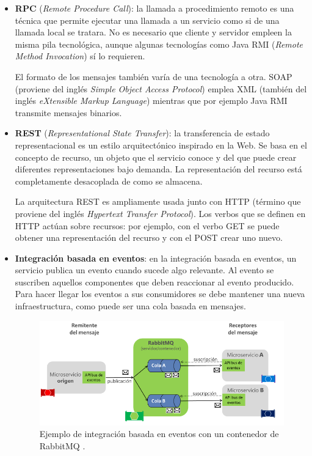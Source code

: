 \documentclass[11pt,spanish,listoffigures]{tfgetsinf}
\begin{document}
\begin{itemize}

\item \textbf{RPC} (\textit{Remote Procedure Call}): la llamada a procedimiento remoto es una técnica que permite ejecutar una llamada a un servicio como si de una llamada local se tratara. No es necesario que cliente y servidor empleen la misma pila tecnológica, aunque algunas tecnologías como Java RMI (\textit{Remote Method Invocation}) sí lo requieren. 

El formato de los mensajes también varía de una tecnología a otra. SOAP (proviene del inglés \textit{Simple Object Access Protocol}) emplea XML (también del inglés \textit{eXtensible Markup Language}) mientras que por ejemplo Java RMI transmite mensajes binarios.

\item \textbf{REST} (\textit{Representational State Transfer}): la transferencia de estado representacional es un estilo arquitectónico inspirado en la Web. Se basa en el concepto de recurso, un objeto que el servicio conoce y del que puede crear diferentes representaciones bajo demanda. La representación del recurso está completamente desacoplada de como se almacena.

La arquitectura REST es ampliamente usada junto con HTTP (término que proviene del inglés \textit{Hypertext Transfer Protocol}). Los verbos que se definen en HTTP actúan sobre recursos: por ejemplo, con el verbo GET se puede obtener una representación del recurso y con el POST crear uno nuevo.

\item \textbf{Integración basada en eventos}: en la integración basada en eventos, un servicio publica un evento cuando sucede algo relevante. Al evento se suscriben aquellos componentes que deben reaccionar al evento producido. Para hacer llegar los eventos a sus consumidores se debe mantener una nueva infraestructura, como puede ser una cola basada en mensajes.

\begin{figure}[h]
\centering
\includegraphics[scale=0.85]{rabbitmq}
\caption{Ejemplo de integración basada en eventos con un contenedor de RabbitMQ \cite{DelaTorre2018}.}
\label{fig:rabbitmq}
\end{figure}


\end{itemize}
\end{document}
